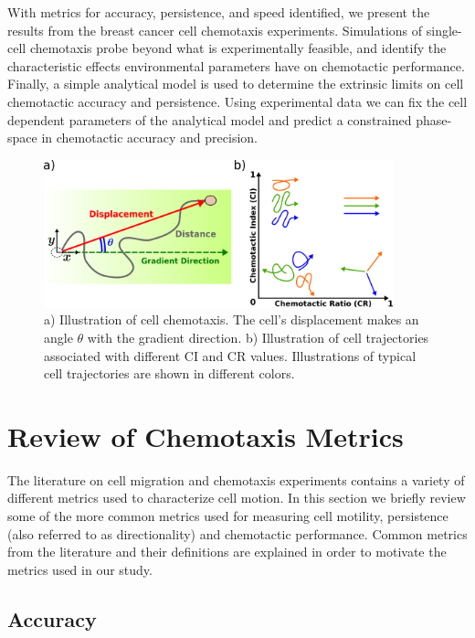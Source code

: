 With metrics for accuracy, persistence, and speed identified, we present the results from the breast cancer cell chemotaxis experiments. Simulations of single-cell chemotaxis probe beyond what is experimentally feasible, and identify the characteristic effects environmental parameters have on chemotactic performance. Finally, a simple analytical model is used to determine the extrinsic limits on cell chemotactic accuracy and persistence. Using experimental data we can fix the cell dependent parameters of the analytical model and predict a constrained phase-space in chemotactic accuracy and precision.

\begin{figure}
    \centering
    \includegraphics[width=0.90\textwidth]{../fig/ch2_fig1.png}
    \caption{a) Illustration of cell chemotaxis. The cell's displacement makes an angle $\theta$ with the gradient direction. b) Illustration of cell trajectories associated with different CI and CR values. Illustrations of typical cell trajectories are shown in different colors.} \label{fig:ch2_1}
\end{figure}


\section{Review of Chemotaxis Metrics}

The literature on cell migration and chemotaxis experiments contains a variety of different metrics used to characterize cell motion. In this section we briefly review some of the more common metrics used for measuring cell motility, persistence (also referred to as directionality) and chemotactic performance. Common metrics from the literature and their definitions are explained in order to motivate the metrics used in our study.

\subsection{Accuracy}

